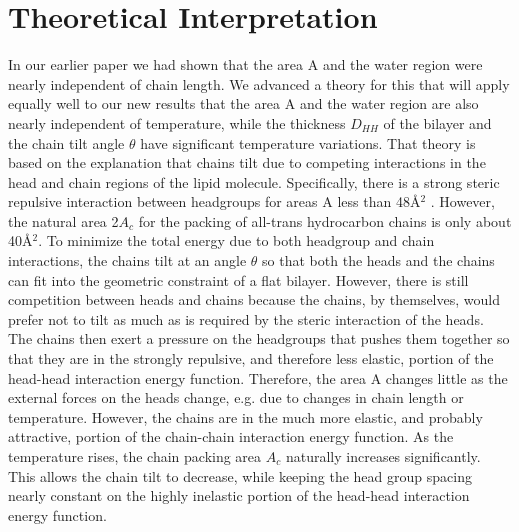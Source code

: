 \section{Theoretical Interpretation}

In our earlier paper \cite{STN92} we had shown that the 
area A and
the water region were nearly independent of chain length.  We 
advanced a theory for this that will apply equally well to our
new results that the area A and the water region are also nearly
independent of temperature, while the thickness $D_{HH}$ of the bilayer and
the chain tilt angle $\theta$ have significant temperature variations.
That theory is based on the explanation \cite{Nag76,McI80}
that chains tilt due to 
competing interactions in the head and chain regions of the lipid
molecule.  Specifically, there is a strong steric repulsive interaction between
headgroups for areas A less than 48\AA$^2$ \cite{STN92}.
However, the natural area 2$A_c$
for the packing of all-trans hydrocarbon chains is only about 40\AA$^2$.  To
minimize the total energy due to both headgroup and chain interactions, the
chains tilt at an angle $\theta$ so that both the heads and the chains 
can fit into the geometric constraint of a flat bilayer.  However, there is
still competition between heads and chains because the chains, by themselves,
would prefer not to tilt as much as is required by the steric interaction
of the heads.  The chains then exert a pressure on the headgroups
that pushes them together so that they are in the strongly repulsive, and
therefore less elastic, portion of the head-head interaction energy function.  
Therefore, the area A changes little as the external forces on the heads
change, e.g. due to changes in chain length or temperature.  However, the 
chains are in the much more elastic, and probably attractive, portion of the
chain-chain interaction energy function.  As the temperature rises, the chain
packing area $A_c$ naturally increases significantly.  This allows the chain
tilt to decrease, while keeping the head group spacing nearly constant on the 
highly inelastic portion of the head-head interaction energy function. 


